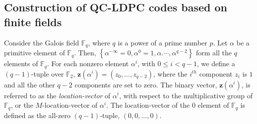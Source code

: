 \documentclass[journal,draftclsnofoot,onecolumn,12pt,twoside]{IEEEtran}
\begin{document}
\subsection{Construction of QC-LDPC codes based on finite fields}\label{sec3_2}
Consider the Galois field $\mathbb{F}_q$, where $q$ is a power of a prime number $p$. Let $\alpha$ be a primitive element of $\mathbb{F}_q$. Then, $\left\{\alpha^{-\infty}=0,\alpha^0=1,\alpha.\cdots ,\alpha^{q-2}\right\}$ form all the $q$ elements of $\mathbb{F}_q$.
For each nonzero element $\alpha^i$, with $0\leq i<q-1$, we define a $(q-1)$-tuple over $\mathbb{F}_2$, $\mathbf{z}(\alpha^i)=(z_0,\ldots ,z_{q-2})$, where the $i^{th}$ component $z_i$ is $1$ and all the other $q-2$  components are set to zero. The binary vector, $\mathbf{z}(\alpha^i)$, is referred to as the \emph{location-vector} of $\alpha^i$, with respect to the multiplicative group of $\mathbb{F}_q$, or the $M$-location-vector of $\alpha^i$. The location-vector of the $0$ element of $\mathbb{F}_q$ is defined as the all-zero $(q-1)$-tuple, $(0, 0, \ldots, 0)$.
\end{document}
